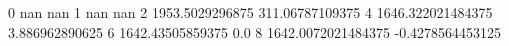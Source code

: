 0 nan nan
1 nan nan
2 1953.5029296875 311.06787109375
4 1646.322021484375 3.886962890625
6 1642.43505859375 0.0
8 1642.0072021484375 -0.4278564453125
